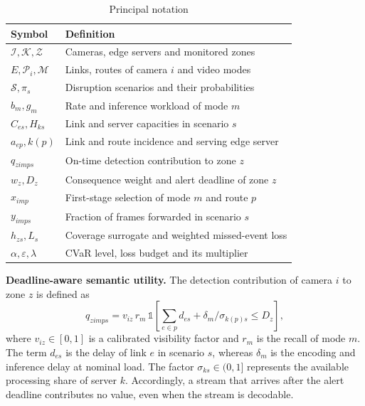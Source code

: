 \documentclass[letterpaper,journal]{IEEEtran}
\begin{document}
\begin{table}[t]
\caption{Principal notation}
\label{tab:notation}
\centering\footnotesize
\begin{tabular}{@{}p{}p{}@{}}
\toprule
Symbol & Definition \\ \midrule
$\mathcal I,\mathcal K,\mathcal Z$ & Cameras, edge servers and monitored zones \\
$E,\mathcal P_i,\mathcal M$ & Links, routes of camera $i$ and video modes \\
$\mathcal S,\pi_s$ & Disruption scenarios and their probabilities \\
$b_{m},g_{m}$ & Rate and inference workload of mode $m$ \\
$C_{es},H_{ks}$ & Link and server capacities in scenario $s$ \\
$a_{ep},k(p)$ & Link and route incidence and serving edge server \\
$q_{zimps}$ & On-time detection contribution to zone $z$ \\
$w_z,D_z$ & Consequence weight and alert deadline of zone $z$ \\
$x_{imp}$ & First-stage selection of mode $m$ and route $p$ \\
$y_{imps}$ & Fraction of frames forwarded in scenario $s$ \\
$h_{zs},L_s$ & Coverage surrogate and weighted missed-event loss \\
$\alpha,\varepsilon,\lambda$ & CVaR level, loss budget and its multiplier \\
\bottomrule
\end{tabular}
\end{table}

\textbf{Deadline-aware semantic utility.} The detection contribution of camera $i$ to zone $z$ is defined as
\begin{equation}
q_{zimps}=v_{iz}\,r_m\,\mathbb 1\!\left[\textstyle\sum_{e\in p}d_{es}+\delta_m/\sigma_{k(p)s}\le D_z\right],
\label{eq:q}
\end{equation}
where $v_{iz}\in[0,1]$ is a calibrated visibility factor and $r_m$ is the recall of mode $m$. The term $d_{es}$ is the delay of link $e$ in scenario $s$, whereas $\delta_m$ is the encoding and inference delay at nominal load. The factor $\sigma_{ks}\in(0,1]$ represents the available processing share of server $k$. Accordingly, a stream that arrives after the alert deadline contributes no value, even when the stream is decodable.
\end{document}
